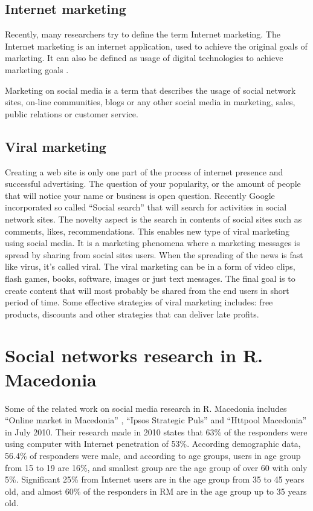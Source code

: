 \documentclass[conference]{IEEEtran}
\begin{document}
\subsection{Internet marketing}

Recently, many researchers try to define the term Internet marketing. The
Internet marketing is an internet application, used to achieve the original
goals of marketing. It can also be defined as usage of digital technologies to
achieve marketing goals \cite{ellis2009internet}. 

Marketing on social media is a term that describes the usage of social network
sites, on-line communities, blogs or any other social media in marketing, sales,
public relations or customer service.

\subsection{Viral marketing}

Creating a web site is only one part of the process of internet presence and
successful advertising. The question of your popularity, or the amount of
people that will notice your name or business is open question. Recently Google
incorporated so called ``Social search'' that will search for activities in
social network sites. The novelty aspect is the search in contents of social
sites such as comments, likes, recommendations. This enables new type of viral
marketing using social media. It is a marketing phenomena where a marketing
messages is spread by sharing from social sites users. When the spreading of the
news is fast like virus, it's called viral. The viral marketing can be in a form
of video clips, flash games, books, software, images or just text messages. The
final goal is to create content that will most probably be shared from the end
users in short period of time. Some effective strategies of viral marketing
includes: free products, discounts and other strategies that can deliver late
profits.

\section{Social networks research in R. Macedonia}

Some of the related work on social media research in R. Macedonia includes
``Online market in Macedonia'' \cite{OnlineMarketMacedonia}, ``Ipsos Strategic
Puls'' \cite{ipsosInMacedonia} and ``Httpool Macedonia'' \cite{httpPool} in
July 2010. Their research made in 2010 states that 63\% of the responders were
using computer with Internet penetration of 53\%. According demographic data,
56.4\% of responders were male, and according to age groups, users in age group
from 15 to 19 are 16\%, and smallest group are the age group of over 60 with
only 5\%. Significant 25\% from Internet users are in the age group from 35 to
45 years old, and almost 60\% of the responders in RM are in the age group up to
35 years old.
\end{document}
